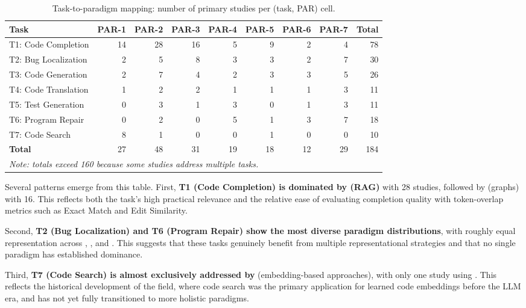 \begin{table}[ht]
\caption{Task-to-paradigm mapping: number of primary studies per (task, PAR) cell.}
\label{tab:task2par}
\small
\begin{tabular}{lrrrrrrr|r}
\toprule
\textbf{Task} & \textbf{PAR-1} & \textbf{PAR-2} & \textbf{PAR-3} & \textbf{PAR-4}
              & \textbf{PAR-5} & \textbf{PAR-6} & \textbf{PAR-7} & \textbf{Total} \\
\midrule
T1: Code Completion     & 14 & 28 & 16 & 5  & 9  & 2  & 4  & 78 \\
T2: Bug Localization    & 2  & 5  & 8  & 3  & 3  & 2  & 7  & 30 \\
T3: Code Generation     & 2  & 7  & 4  & 2  & 3  & 3  & 5  & 26 \\
T4: Code Translation    & 1  & 2  & 2  & 1  & 1  & 1  & 3  & 11 \\
T5: Test Generation     & 0  & 3  & 1  & 3  & 0  & 1  & 3  & 11 \\
T6: Program Repair      & 0  & 2  & 0  & 5  & 1  & 3  & 7  & 18 \\
T7: Code Search         & 8  & 1  & 0  & 0  & 1  & 0  & 0  & 10 \\
\midrule
\textbf{Total}          & 27 & 48 & 31 & 19 & 18 & 12 & 29 & 184\\
\bottomrule
\multicolumn{9}{l}{\textit{Note: totals exceed 160 because some studies address multiple tasks.}}
\end{tabular}
\end{table}

Several patterns emerge from this table. First, \textbf{T1 (Code Completion) is dominated by
 (RAG)} with 28 studies, followed by  (graphs) with 16. This reflects
both the task's high practical relevance and the relative ease of evaluating completion
quality with token-overlap metrics such as Exact Match and Edit Similarity.

Second, \textbf{T2 (Bug Localization) and T6 (Program Repair) show the most diverse paradigm
distributions}, with roughly equal representation across , , and .
This suggests that these tasks genuinely benefit from multiple representational strategies
and that no single paradigm has established dominance.

Third, \textbf{T7 (Code Search) is almost exclusively addressed by } (embedding-based
approaches), with only one study using . This reflects the historical development of
the field, where code search was the primary application for learned code embeddings before
the LLM era, and has not yet fully transitioned to more holistic paradigms.

